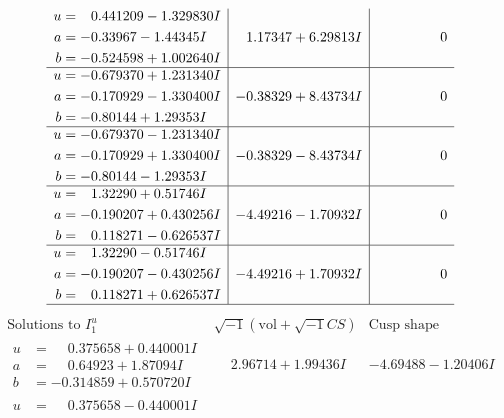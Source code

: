 \documentclass[1p]{elsarticle_modified}
\theoremstyle{definition}
\newcommand{\I}{\sqrt{-1}}
\begin{document}
$$\begin{array}{c|c|c}
\begin{aligned}
u &= \phantom{-}0.441209 - 1.329830 I \\
a &= -0.33967 - 1.44345 I \\
b &= -0.524598 + 1.002640 I\end{aligned}
 & \phantom{-}1.17347 + 6.29813 I & \phantom{-0.000000 } 0 \\ \hline\begin{aligned}
u &= -0.679370 + 1.231340 I \\
a &= -0.170929 - 1.330400 I \\
b &= -0.80144 + 1.29353 I\end{aligned}
 & -0.38329 + 8.43734 I & \phantom{-0.000000 } 0 \\ \hline\begin{aligned}
u &= -0.679370 - 1.231340 I \\
a &= -0.170929 + 1.330400 I \\
b &= -0.80144 - 1.29353 I\end{aligned}
 & -0.38329 - 8.43734 I & \phantom{-0.000000 } 0 \\ \hline\begin{aligned}
u &= \phantom{-}1.32290 + 0.51746 I \\
a &= -0.190207 + 0.430256 I \\
b &= \phantom{-}0.118271 - 0.626537 I\end{aligned}
 & -4.49216 - 1.70932 I & \phantom{-0.000000 } 0 \\ \hline\begin{aligned}
u &= \phantom{-}1.32290 - 0.51746 I \\
a &= -0.190207 - 0.430256 I \\
b &= \phantom{-}0.118271 + 0.626537 I\end{aligned}
 & -4.49216 + 1.70932 I & \phantom{-0.000000 } 0\\
 \hline 
 \end{array}$$\newpage$$\begin{array}{c|c|c}  
\text{Solutions to }I^u_{1}& \I (\text{vol} + \sqrt{-1}CS) & \text{Cusp shape}\\
 \hline 
\begin{aligned}
u &= \phantom{-}0.375658 + 0.440001 I \\
a &= \phantom{-}0.64923 + 1.87094 I \\
b &= -0.314859 + 0.570720 I\end{aligned}
 & \phantom{-}2.96714 + 1.99436 I & -4.69488 - 1.20406 I \\ \hline\begin{aligned}
u &= \phantom{-}0.375658 - 0.440001 I \\

\end{aligned}
\end{array}$$
\end{document}
